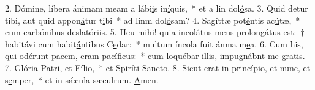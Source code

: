 2. Dómine, líbera ánimam meam a lábi\uline{i}s in\uline{í}quis,~* et a lin dol\uline{ó}sa.
3. Quid detur tibi, aut quid appon\uline{á}tur t\uline{i}bi~* ad linm dol\uline{ó}sam?
4. Sagíttæ pot\uline{é}ntis ac\uline{ú}tæ,~* cum carbónibus deslat\uline{ó}riis.
5. Heu mihi! quia incolátus meus prolongátus est:~† habitávi cum habit\uline{á}ntibus C\uline{e}dar:~* multum íncola fuit ánma m\uline{e}a.
6. Cum his, qui odérunt pacem, \uline{e}ram pac\uline{í}ficus:~* cum loquébar illis, impugnábnt me gr\uline{a}tis.
7. Glória P\uline{a}tri, et F\uline{í}lio,~* et Spiríti S\uline{a}ncto.
8. Sicut erat in princípio, et n\uline{u}nc, et s\uline{e}mper,~* et in sǽcula sæculrum. \uline{A}men.
